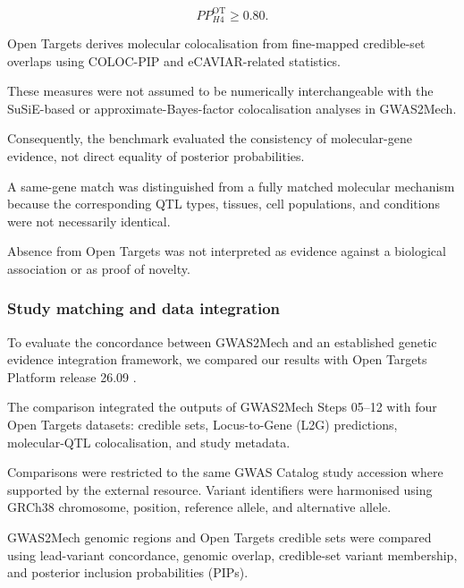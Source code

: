 \documentclass[11pt,a4paper]{article}
\begin{document}
\begin{equation}
PP_{H4}^{\mathrm{OT}} \geq 0.80.
\end{equation}

Open Targets derives molecular colocalisation
from fine-mapped credible-set overlaps using
COLOC-PIP and eCAVIAR-related statistics.

These measures were not assumed to be
numerically interchangeable with the
SuSiE-based or approximate-Bayes-factor
colocalisation analyses in GWAS2Mech.

Consequently, the benchmark evaluated
the consistency of molecular-gene evidence,
not direct equality of posterior probabilities.

A same-gene match was distinguished from
a fully matched molecular mechanism because
the corresponding QTL types, tissues,
cell populations, and conditions were not
necessarily identical.

Absence from Open Targets was not interpreted
as evidence against a biological association
or as proof of novelty.




\label{sec:step13_opentargets}

\subsubsection{Study matching and data integration}

To evaluate the concordance between GWAS2Mech and an
established genetic evidence integration framework,
we compared our results with Open Targets Platform
release 26.09 \citep{Mountjoy2021,OpenTargets2026Release}.

The comparison integrated the outputs of GWAS2Mech
Steps 05--12 with four Open Targets datasets:
credible sets, Locus-to-Gene (L2G) predictions,
molecular-QTL colocalisation, and study metadata.

Comparisons were restricted to the same GWAS Catalog
study accession where supported by the external
resource. Variant identifiers were harmonised using
GRCh38 chromosome, position, reference allele, and
alternative allele.

GWAS2Mech genomic regions and Open Targets credible
sets were compared using lead-variant concordance,
genomic overlap, credible-set variant membership,
and posterior inclusion probabilities (PIPs).
\end{document}

